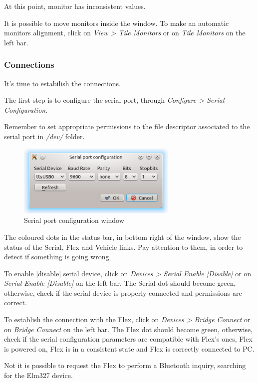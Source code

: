 \documentclass[twoside]{article}
\begin{document}
\begin{multicols}{2}
At this point, monitor has inconsistent values.

It is possible to move monitors inside the window. To make an automatic monitors alignment, click on \emph{View > Tile Monitors} or on \emph{Tile Monitors} on the left bar.

\subsubsection{Connections}

It's time to estabilish the connections.

The first step is to configure the serial port, through \emph{Configure > Serial Configuration}.

Remember to set appropriate permissions to the file descriptor associated to the serial port in \emph{/dev/} folder.

\begin{figure}[H]
  \centering
  \includegraphics[width=3in]{img/GUI/serial_port_configuration}
  \caption{Serial port configuration window}
\end{figure}


The coloured dots in the status bar, in bottom right of the window, show the status of the Serial, Flex and Vehicle links.
Pay attention to them, in order to detect if something is going wrong.

To enable [disable] serial device, click on \emph{Devices > Serial Enable [Disable]} or on \emph{Serial Enable [Disable]} on the left bar.
The Serial dot should become green, otherwise, check if the serial device is properly connected and permissions are correct.

To establish the connection with the Flex, click on \emph{Devices > Bridge Connect} or on \emph{Bridge Connect} on the left bar.
The Flex dot should become green, otherwise, check if the serial configuration parameters are compatible with Flex's ones, Flex is powered on, Flex is in a consistent state and Flex is correctly connected to PC.

Not it is possible to request the Flex to perform a Bluetooth inquiry, searching for the Elm327 device.


\end{multicols}
\end{document}
